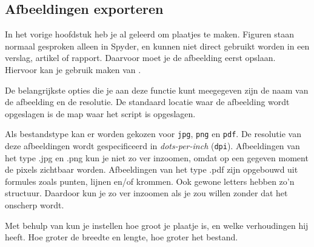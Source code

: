 \documentclass[a4paper,11pt, fleqn]{article}
\begin{document}
\subsection{Afbeeldingen exporteren}
In het vorige hoofdstuk heb je al geleerd om plaatjes te maken. Figuren staan normaal gesproken alleen in Spyder, en kunnen niet direct gebruikt worden in een verslag, artikel of rapport. Daarvoor moet je de afbeelding eerst opslaan. Hiervoor kan je gebruik maken van .

De belangrijkste opties die je aan deze functie kunt meegegeven zijn de naam van de afbeelding en de resolutie. De standaard locatie waar de afbeelding wordt opgeslagen is de map waar het script is opgeslagen. 

Als bestandstype kan er worden gekozen voor \verb.jpg., \verb.png. en  \verb.pdf.. 
De resolutie van deze afbeeldingen wordt gespecificeerd in \textit{dots-per-inch}  (\verb,dpi,).
Afbeeldingen van het type .jpg en .png kun je niet zo ver inzoomen, omdat op een gegeven moment de pixels zichtbaar worden. 
Afbeeldingen van het type .pdf zijn opgebouwd uit formules zoals punten, lijnen en/of krommen. Ook gewone letters hebben zo'n structuur. Daardoor kun je zo ver inzoomen als je zou willen zonder dat het onscherp wordt.

Met behulp van  kun je instellen hoe groot je plaatje is, en welke verhoudingen hij heeft. Hoe groter de breedte en lengte, hoe groter het bestand.

\end{document}
